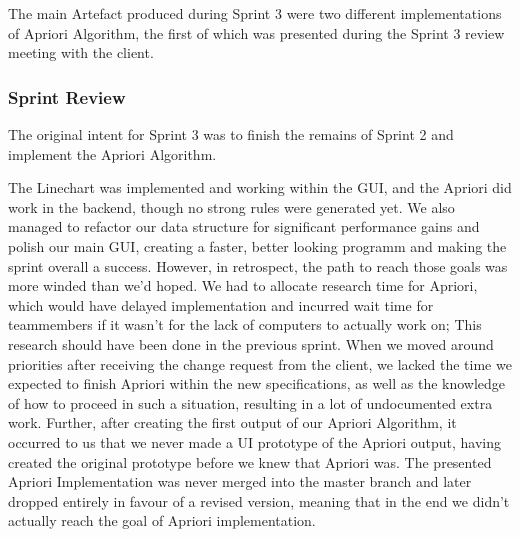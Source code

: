 The main Artefact produced during Sprint 3 were two different implementations of Apriori Algorithm, the first of which was presented during the Sprint 3 review meeting with the client. 


\subsubsection*{Sprint Review}

The original intent for Sprint 3 was to finish the remains of Sprint 2 and implement the Apriori Algorithm. 

The Linechart was implemented and working within the GUI, and the Apriori did work in the backend, though no strong rules were generated yet. We also managed to refactor our data structure for significant performance gains and polish our main GUI, creating a faster, better looking programm and making the sprint overall a success. 
However, in retrospect, the path to reach those goals was more winded than we'd hoped. 
We had to allocate research time for Apriori, which would have delayed implementation and incurred wait time for teammembers if it wasn't for the lack of computers to actually work on; This research should have been done in the previous sprint. 
When we moved around priorities after receiving the change request from the client, we lacked the time we expected to finish Apriori within the new specifications, as well as the knowledge of how to proceed in such a situation, resulting in a lot of undocumented extra work. 
Further, after creating the first output of our Apriori Algorithm, it occurred to us that we never made a UI prototype of the Apriori output, having created the original prototype before we knew that Apriori was.
The presented Apriori Implementation was never merged into the master branch and later dropped entirely in favour of a revised version, meaning that in the end we didn't actually reach the goal of Apriori implementation. 